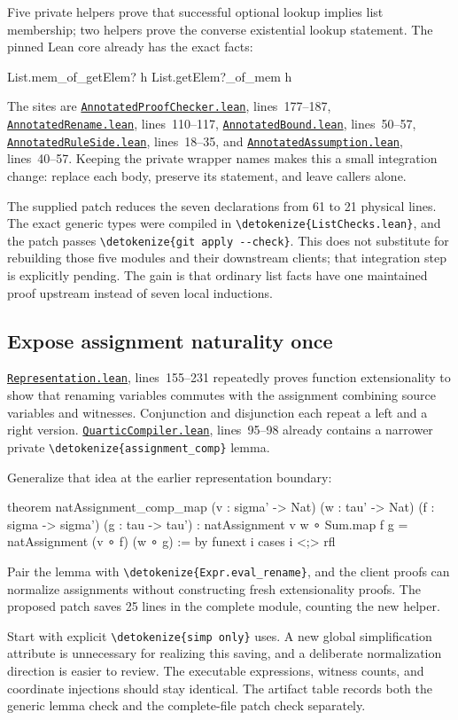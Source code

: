 \documentclass[11pt,letterpaper]{article}
\newcommand{\code}[1]{\expandafter\nolinkurl\expandafter{\detokenize{#1}}}
\newcommand{\repo}{https://github.com/VladimirReshetnikov/ProveIt/blob/60e9c5d620c6c387d932876cfa2d9376f64ea56c}
\newcommand{\src}[2]{\href{\repo/Computability/DiophantineConsistency/Lean/DiophantineConsistency/#1.lean}{\nolinkurl{#1.lean}}, lines~#2}
\begin{document}
Five private helpers prove that successful optional lookup implies list membership; two helpers prove the converse existential lookup statement. The pinned Lean core already has the exact facts:
\begin{Lean}
List.mem_of_getElem? h
List.getElem?_of_mem h
\end{Lean}

The sites are \src{AnnotatedProofChecker}{177--187}, \src{AnnotatedRename}{110--117}, \src{AnnotatedBound}{50--57}, \src{AnnotatedRuleSide}{18--35}, and \src{AnnotatedAssumption}{40--57}. Keeping the private wrapper names makes this a small integration change: replace each body, preserve its statement, and leave callers alone.

The supplied patch reduces the seven declarations from 61 to 21 physical lines. The exact generic types were compiled in \code{ListChecks.lean}, and the patch passes \code{git apply --check}. This does not substitute for rebuilding those five modules and their downstream clients; that integration step is explicitly pending. The gain is that ordinary list facts have one maintained proof upstream instead of seven local inductions.

\subsection{Expose assignment naturality once}

\src{Representation}{155--231} repeatedly proves function extensionality to show that renaming variables commutes with the assignment combining source variables and witnesses. Conjunction and disjunction each repeat a left and a right version. \src{QuarticCompiler}{95--98} already contains a narrower private \code{assignment_comp} lemma.

Generalize that idea at the earlier representation boundary:
\begin{Lean}
theorem natAssignment_comp_map
    (v : sigma' -> Nat) (w : tau' -> Nat)
    (f : sigma -> sigma') (g : tau -> tau') :
    natAssignment v w ∘ Sum.map f g =
      natAssignment (v ∘ f) (w ∘ g) := by
  funext i
  cases i <;> rfl
\end{Lean}
Pair the lemma with \code{Expr.eval_rename}, and the client proofs can normalize assignments without constructing fresh extensionality proofs. The proposed patch saves 25 lines in the complete module, counting the new helper.

Start with explicit \code{simp only} uses. A new global simplification attribute is unnecessary for realizing this saving, and a deliberate normalization direction is easier to review. The executable expressions, witness counts, and coordinate injections should stay identical. The artifact table records both the generic lemma check and the complete-file patch check separately.
\end{document}
